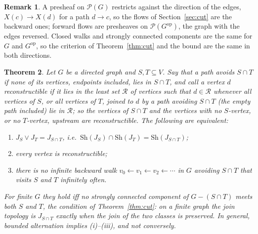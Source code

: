 \documentclass[11pt]{amsart}
\newtheorem{thm}{Theorem}[section]
\theoremstyle{definition}
\newtheorem{rem}[thm]{Remark}
\newcommand{\Sh}{\mathrm{Sh}}
\newcommand{\cP}{\mathcal P}
\begin{document}
\begin{rem}
A presheaf on $\cP(G)$ restricts against the direction of the edges,
$X(c)\to X(d)$ for a path $d\to c$, so the flows of
Section~\ref{sec:cut} are the backward ones; forward flows are presheaves
on $\cP(G^{\mathrm{op}})$, the graph with the edges reversed. Closed walks
and strongly connected components are the same for $G$ and
$G^{\mathrm{op}}$, so the criterion of Theorem~\ref{thm:cut} and the
bound are the same in both directions.
\end{rem}

\begin{thm}\label{thm:topjoin}
Let $G$ be a directed graph and $S,T\subseteq V$. Say that a path
\emph{avoids} $S\cap T$ if none of its vertices, endpoints included, lies
in $S\cap T$, and call a vertex $d$ \emph{reconstructible} if it lies in
the least set $\mathcal R$ of vertices such that $d\in\mathcal R$ whenever
all vertices of $S$, or all vertices of $T$, joined to $d$ by a path
avoiding $S\cap T$ (the empty path included) lie in $\mathcal R$; so the
vertices of $S\cap T$ and the vertices with no $S$-vertex, or no
$T$-vertex, upstream are reconstructible. The following are equivalent:
\begin{enumerate}
\item[(i)] $J_S\vee J_T=J_{S\cap T}$, i.e.\ $\Sh(J_S)\cap\Sh(J_T)=
\Sh(J_{S\cap T})$;
\item[(ii)] every vertex is reconstructible;
\item[(iii)] there is no infinite backward walk $v_0\leftarrow v_1\leftarrow
v_2\leftarrow\cdots$ in $G$ avoiding $S\cap T$ that visits $S$ and $T$
infinitely often.
\end{enumerate}
For finite $G$ they hold iff no strongly connected component of
$G-(S\cap T)$ meets both $S$ and $T$, the condition of
Theorem~\ref{thm:cut}: on a finite graph the join topology is $J_{S\cap
T}$ exactly when the join of the two classes is preserved. In general,
bounded alternation implies (i)--(iii), and not conversely.
\end{thm}
\end{document}
